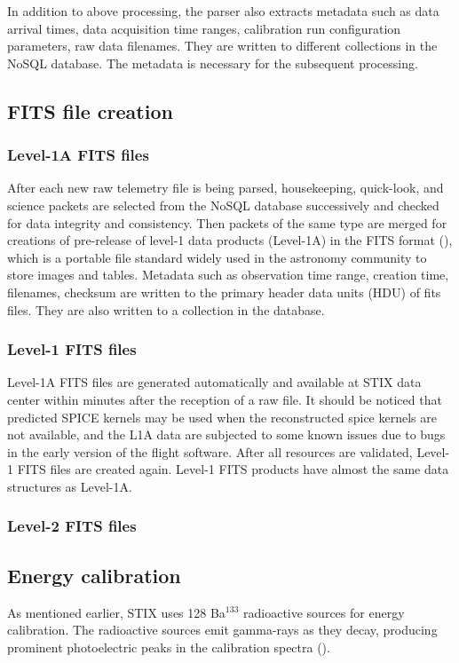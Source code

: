 \documentclass[referee]{aa} %
\begin{document}
In addition to above processing, the parser also extracts metadata such as data arrival 
times, data acquisition time ranges,  calibration run configuration parameters,  raw data 
filenames. They are written to different collections in the NoSQL database. 
The metadata is necessary for the subsequent processing. 

\subsection{FITS file creation}
\subsubsection{Level-1A FITS files}
After each new raw telemetry file is being parsed, 
housekeeping, quick-look, and science packets  
are selected from the NoSQL database successively 
and checked for data integrity and consistency. 
Then packets of the same type are merged for creations of pre-release of 
level-1 data products (Level-1A)
 in the FITS format (\cite{fits}), 
which is a portable file standard widely used in the astronomy 
community to store images and tables.
Metadata such as observation time range, creation time, filenames,  checksum are written to 
the primary header data units (HDU) of fits files. 
They are also written to a collection in the database.

\subsubsection{Level-1 FITS files}
Level-1A FITS files are generated automatically and available at STIX data center within minutes 
after the reception of a raw file.
It should be noticed that predicted SPICE kernels may be used when the reconstructed spice kernels  
are not available, and the L1A data are subjected to some known issues 
due to bugs in the early version of the flight software.
After all resources are validated,  Level-1  FITS files are created again. 
Level-1  FITS products have almost the same data structures as Level-1A.

\subsubsection{Level-2 FITS files}


\subsection{Energy calibration}
As mentioned earlier, STIX uses 128 Ba$^{133}$ radioactive sources for energy calibration.
The radioactive sources emit  gamma-rays  as they decay, producing prominent photoelectric 
peaks in the calibration spectra (\cite{oliver}). 
\end{document}
